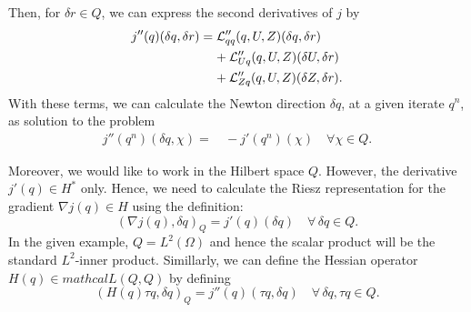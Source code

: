 {Then, for $\delta r\in Q$, we can express the second derivatives of $j$ by
\begin{align*}
j''(q)(\delta q, \delta r) 
&= {\cal L}_{qq}'' (q,U,Z)(\delta q,\delta r) \\
&\;\;\;\;+ {\cal L}_{Uq}'' (q,U,Z)(\delta U,\delta r) \\ 
&\;\;\;\;+ {\cal L}_{Zq}'' (q,U,Z)(\delta Z,\delta r).
\end{align*}
With these terms, we can calculate the Newton direction $\delta q$, at a given 
iterate $q^n$, as solution to the problem
\begin{align*}
j''(q^n )(\delta q,\chi ) =&\, -j'(q^n)(\chi) \quad\forall\chi \in Q.
\end{align*}

Moreover, we would like to work in the Hilbert space $Q$. However, the derivative 
$j'(q) \in H^*$ only. Hence, we need to calculate the Riesz representation 
for the gradient $\nabla j(q) \in H$ using the definition:
\[
 (\nabla j(q),\delta q)_Q = j'(q)(\delta q) \quad \forall\,\delta q\in Q.
\]
In the given example, $Q = L^2(\Omega)$ and hence the scalar product will be the
standard $L^2$-inner product. Simillarly, we can define the Hessian operator 
$H(q) \in mathcal L(Q,Q)$ by defining
\[
 (H(q)\tau q,\delta q)_Q = j''(q)(\tau q,\delta q) \quad \forall\,\delta q,\tau q\in Q.
\]
}

